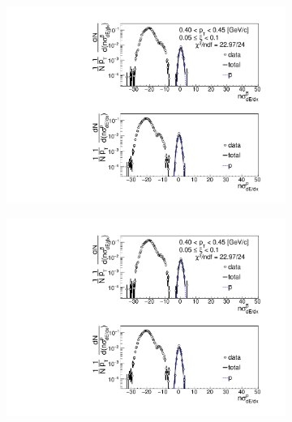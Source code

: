 \begin{figure}[h!]
\begin{subfigure}{.32\textwidth}
	\end{subfigure}
	\begin{subfigure}{.32\textwidth}
		\includegraphics[width=\linewidth, page=4]{chapters/chrgSTAR/img/dEdx/fit2019_thirdStep_2_1.pdf}
	\end{subfigure}
	\begin{subfigure}{.32\textwidth}
		\includegraphics[width=\linewidth, page=5]{chapters/chrgSTAR/img/dEdx/fit2019_thirdStep_2_1.pdf}
	\end{subfigure}
	\begin{subfigure}{.32\textwidth}

\end{subfigure}
\end{figure}
